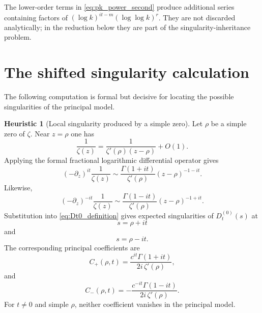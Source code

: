 \documentclass[11pt]{amsart}
\numberwithin{equation}{section}
\theoremstyle{plain}
\theoremstyle{definition}
\newtheorem{heuristic}[theorem]{Heuristic}
\theoremstyle{remark}
\begin{document}
The lower-order terms in \eqref{eq:pk_power_second} produce additional
series containing factors of $(\log k)^{it-m}(\log\log k)^r$.  They are
not discarded analytically; in the reduction below they are part of the
singularity-inheritance problem.

\section{The shifted singularity calculation}
\label{sec:singularity_calculation}

The following computation is formal but decisive for locating the
possible singularities of the principal model.

\begin{heuristic}[Local singularity produced by a simple zero]
\label{heur:local_singularity}
Let $\rho$ be a simple zero of $\zeta$.  Near $z=\rho$ one has
\begin{equation}
\frac1{\zeta(z)}=\frac{1}{\zeta'(\rho)(z-\rho)}+O(1).
\label{eq:local_recip_zeta}
\end{equation}
Applying the formal fractional logarithmic differential operator gives
\begin{equation}
(-\partial_z)^{it}\frac1{\zeta(z)}
\sim
\frac{\Gamma(1+it)}{\zeta'(\rho)}(z-\rho)^{-1-it}.
\label{eq:fractional_singularity_plus}
\end{equation}
Likewise,
\begin{equation}
(-\partial_z)^{-it}\frac1{\zeta(z)}
\sim
\frac{\Gamma(1-it)}{\zeta'(\rho)}(z-\rho)^{-1+it}.
\label{eq:fractional_singularity_minus}
\end{equation}
Substitution into \eqref{eq:Dt0_definition} gives expected singularities
of $D_t^{(0)}(s)$ at
\begin{equation}
s=\rho+it
\label{eq:singularity_location_plus}
\end{equation}
and
\begin{equation}
s=\rho-it.
\label{eq:singularity_location_minus}
\end{equation}
The corresponding principal coefficients are
\begin{equation}
C_+(\rho,t)=\frac{c^{it}\Gamma(1+it)}{2i\,\zeta'(\rho)},
\label{eq:Cplus_coefficient}
\end{equation}
and
\begin{equation}
C_-(\rho,t)=-\frac{c^{-it}\Gamma(1-it)}{2i\,\zeta'(\rho)}.
\label{eq:Cminus_coefficient}
\end{equation}
For $t\ne0$ and simple $\rho$, neither coefficient vanishes in the
principal model.
\end{heuristic}
\end{document}
